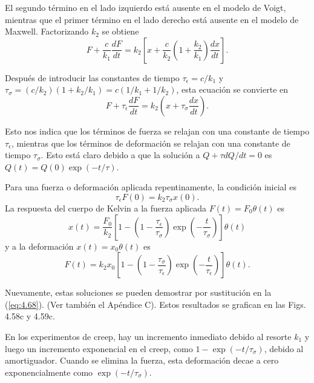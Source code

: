 \documentclass[12pt]{book}
\begin{document}
El segundo término en el lado izquierdo está ausente en el modelo de Voigt, mientras que el primer término en el lado derecho está ausente en el modelo de Maxwell. Factorizando $k_2$ se obtiene
\begin{equation}
F + \frac{c}{k_1} \frac{dF}{dt} = k_2 \left[ x + \frac{c}{k_2} \left( 1 + \frac{k_2}{k_1} \right) \frac{dx}{dt} \right].
\label{eq:4.67}
\end{equation}

Después de introducir las constantes de tiempo $\tau_{\epsilon} = c/k_1$ y $\tau_{\sigma} = (c/k_2)(1 + k_2/k_1) = c(1/k_1 + 1/k_2)$, esta ecuación se convierte en
\begin{equation}
F + \tau_{\epsilon} \frac{dF}{dt} = k_2 \left( x + \tau_{\sigma} \frac{dx}{dt} \right).
\label{eq:4.68}
\end{equation}

Esto nos indica que los términos de fuerza se relajan con una constante de tiempo $\tau_{\epsilon}$, mientras que los términos de deformación se relajan con una constante de tiempo $\tau_{\sigma}$. Esto está claro debido a que la solución a $Q + \tau dQ/dt = 0$ es $Q(t) = Q(0) \exp(-t/\tau)$.

Para una fuerza o deformación aplicada repentinamente, la condición inicial es
\[ \tau_{\epsilon}F(0) = k_2 \tau_{\sigma}x(0). \]
La respuesta del cuerpo de Kelvin a la fuerza aplicada $F(t) = F_0\theta(t)$ es
\begin{equation}
x(t) = \frac{F_0}{k_2} \left[ 1 - \left( 1 - \frac{\tau_{\epsilon}}{\tau_{\sigma}} \right) \exp\left(-\frac{t}{\tau_{\sigma}}\right) \right] \theta(t)
\label{eq:4.69}
\end{equation}
y a la deformación $x(t) = x_0\theta(t)$ es
\begin{equation}
F(t) = k_2 x_0 \left[ 1 - \left( 1 - \frac{\tau_{\sigma}}{\tau_{\epsilon}} \right) \exp\left(-\frac{t}{\tau_{\epsilon}}\right) \right] \theta(t).
\label{eq:4.70}
\end{equation}

Nuevamente, estas soluciones se pueden demostrar por sustitución en la (\ref{eq:4.68}). (Ver también el Apéndice C). Estos resultados se grafican en las Figs. 4.58c y 4.59c.

En los experimentos de creep, hay un incremento inmediato debido al resorte $k_1$ y luego un incremento exponencial en el creep, como $1 - \exp(-t/\tau_{\sigma})$, debido al amortiguador. Cuando se elimina la fuerza, esta deformación decae a cero exponencialmente como $\exp(-t/\tau_{\sigma})$.
\end{document}
